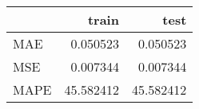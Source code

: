 \begin{tabular}{lrr}
\toprule
{} &      train &       test \\
\midrule
MAE  &   0.050523 &   0.050523 \\
MSE  &   0.007344 &   0.007344 \\
MAPE &  45.582412 &  45.582412 \\
\bottomrule
\end{tabular}

